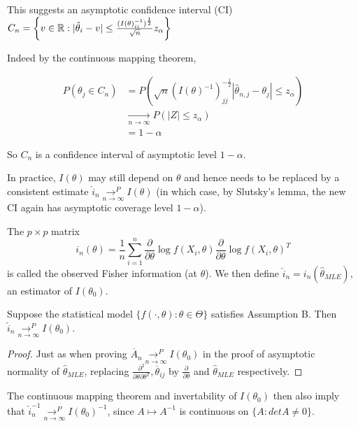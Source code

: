 \documentclass[a4paper]{article}
\begin{document}
This suggests an asymptotic confidence interval (CI) $C_n = \left\{v \in \mathbb{R} : |\hat{\theta}_i - v| \le  \frac{(I(\theta)^{-1}_{ii})^{\frac{1}{2}}}{\sqrt{n} } z_{\alpha}\right\} $

Indeed by the continuous mapping theorem,

\begin{align*}
	P\left( \theta_j \in C_n \right) &= P\left( \sqrt{n} (I(\theta)^{-1})^{- \frac{1}{2}}_{jj}  |\hat{\theta}_{n,j} - \theta_j| \le  z_{\alpha}\right) \\
	&\underset{n\to \infty}{\to } P\left( |Z| \le z_{\alpha} \right) \\
	&= 1- \alpha
\end{align*}

So $C_n$ is a confidence interval of asymptotic level $1-\alpha$.

In practice,  $I(\theta)$ may still depend on  $\theta$ and hence needs to be replaced by a consistent estimate $\hat{i}_{n} \underset{n\to \infty}{\to ^{P}}  I(\theta)$ (in which case, by Slutsky's lemma, the new CI again has asymptotic coverage level $1-\alpha$).

 \begin{defn}
	The $p\times p$ matrix
	\[
		i_n(\theta) = \frac{1}{n}\sum_{i=1}^{n} \frac{\partial }{\partial \theta} \log f(X_i, \theta) \frac{\partial }{\partial \theta} \log f(X_i, \theta)^{T} 
	\] 
	is called the observed Fisher information (at $\theta$).
	We then define $\hat{i}_n = i_n(\hat{\theta}_{MLE})$, an estimator of $I(\theta_0)$.
\end{defn}

\begin{prop}
	Suppose the statistical model $\{f\left( \cdot , \theta \right) : \theta \in \Theta \}$ satisfies Assumption B. Then $\hat{i}_n \underset{n\to \infty}{\to ^{P}} I(\theta_0) $.
\end{prop}

\begin{proof}
	Just as when proving $\overline{A}_n \underset{n\to \infty}{\to ^{P}} I(\theta_0)$ in the proof of asymptotic normality of $\hat{\theta}_{MLE}$,  replacing $\frac{\partial^2 }{\partial \theta \partial\theta^{T}}, \overline{\theta}_{ij} $ by $\frac{\partial }{\partial \theta} $ and $\hat{\theta}_{MLE}$ respectively.
\end{proof}

\begin{remark}
	The continuous mapping theorem and invertability of $I(\theta_0)$ then also imply that $\hat{i}_n^{-1} \underset{n\to \infty}{\to ^{P}} I(\theta_0)^{-1}$, since $A \mapsto A^{-1} $ is continuous on $\{A : det A \neq 0\} $.  
\end{remark}
\end{document}
